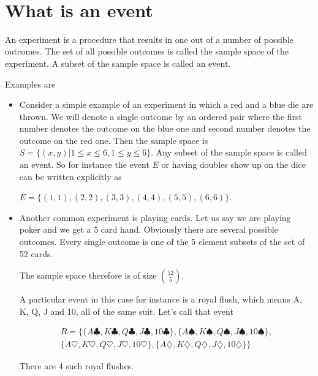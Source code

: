 \documentclass[12pt]{article}
\begin{document}
\begin{center}
\\
\vspace{1cm}
\end{center}


\medskip\noindent


\vspace{0.5cm}\noindent

\section*{What is an event}

An experiment is a procedure that results in one out of a number of possible outcomes. The set of all possible outcomes is called the sample space of the experiment. A subset of the sample space is called an event.

Examples are 

\begin{itemize}
\item Consider a simple example of an experiment in which a red and a blue die are thrown. We will denote a single outcome by an ordered pair where the first number denotes the outcome on the blue one and second number denotes the outcome on the red one.
Then the sample space is $S = \{(x,y)| 1 \le x \le 6, 1 \le y \le 6\}$.
Any subset of the sample space is called an event. So for instance the event $E$ or having doubles show up on the dice can be written explicitly as

$E = \{(1,1), (2,2), (3,3), (4,4), (5,5), (6,6)\}$.

\item Another common experiment is playing cards. Let us say we are playing poker and we get a 5 card hand. Obviously there are several possible outcomes. Every single outcome is one of the 5 element subsets of the set of 52 cards. 

The sample space therefore is of size ${52 \choose 5}$.

A particular event in this case for instance is a royal flush, which means A, K, Q, J and 10, all of the same suit. Let's call that event 

\begin{multline*}
R = \{\{A \clubsuit, K \clubsuit, Q \clubsuit, J \clubsuit, 10 \clubsuit\} , \{A \spadesuit, K \spadesuit, Q \spadesuit, J \spadesuit, 10 \spadesuit \}, \\
\{A \heartsuit, K \heartsuit, Q \heartsuit, J \heartsuit, 10 \heartsuit \} , \{ A \diamondsuit, K \diamondsuit, Q \diamondsuit, J \diamondsuit , 10 \diamondsuit \} \}
\end{multline*} 

There are 4 such royal flushes. 

\end{itemize}
\end{document}
